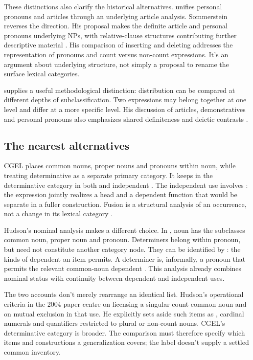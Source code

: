 \documentclass[12pt]{article}
\begin{document}
These distinctions also clarify the historical alternatives. \textcite{postal1966} unifies personal pronouns and articles through an underlying article analysis. Sommerstein reverses the direction. His proposal makes the definite article and personal pronouns underlying NPs, with relative-clause structures contributing further descriptive material \citep[197--203]{sommerstein1972}. His comparison of inserting and deleting  addresses the representation of pronouns and count versus non-count expressions. It's an argument about underlying structure, not simply a proposal to rename the surface lexical categories.

\textcite[232--235]{lyons1968} supplies a useful methodological distinction: distribution can be compared at different depths of subclassification. Two expressions may belong together at one level and differ at a more specific level. His discussion of articles, demonstratives and personal pronouns also emphasizes shared definiteness and deictic contrasts \citep[279]{lyons1968}.

\subsection{The nearest alternatives}

CGEL places common nouns, proper nouns and pronouns within noun, while treating determinative as a separate primary category. It keeps  in the determinative category in both  and independent . The independent use involves : the expression jointly realizes a head and a dependent function that would be separate in a fuller construction. Fusion is a structural analysis of an occurrence, not a change in its lexical category \citep[410--412]{huddleston2002}.

Hudson's nominal analysis makes a different choice. In \textcite[253--254]{hudson2010wordgrammar}, noun has the subclasses common noun, proper noun and pronoun. Determiners belong within pronoun, but need not constitute another category node. They can be identified by : the kinds of dependent an item permits. A determiner is, informally, a pronoun that permits the relevant common-noun dependent \citep[9--10]{hudson2004determiners}. This analysis already combines nominal status with continuity between dependent and independent uses.

The two accounts don't merely rearrange an identical list. Hudson's operational criteria in the 2004 paper centre on licensing a singular count common noun and on mutual exclusion in that use. He explicitly sets aside such items as , cardinal numerals and quantifiers restricted to plural or non-count nouns. CGEL's determinative category is broader. The comparison must therefore specify which items and constructions a generalization covers; the label  doesn't supply a settled common inventory.
\end{document}

